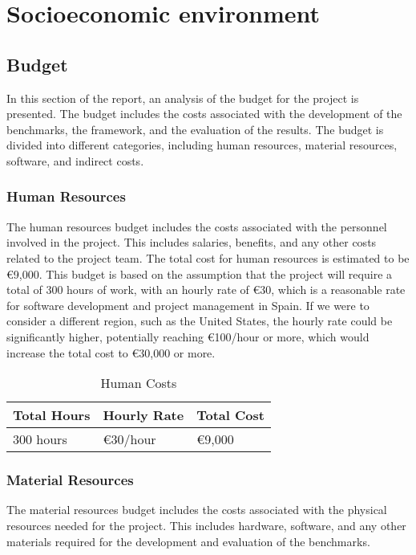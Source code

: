 \chapter{Socioeconomic environment}\label{chap:economic-env}

\section{Budget}
In this section of the report, an analysis of the budget for the project is presented. The budget includes the costs associated with the development of the benchmarks, the framework, and the evaluation of the results. The budget is divided into different categories, including human resources, material resources, software, and indirect costs.

\subsection{Human Resources}
The human resources budget includes the costs associated with the personnel involved in the project. This includes salaries, benefits, and any other costs related to the project team. The total cost for human resources is estimated to be €9,000. This budget is based on the assumption that the project will require a total of 300 hours of work, with an hourly rate of €30, which is a reasonable rate for software development and project management in Spain. If we were to consider a different region, such as the United States, the hourly rate could be significantly higher, potentially reaching €100/hour or more, which would increase the total cost to €30,000 or more.

\begin{table}[h]
  \centering
  \begin{tabular}{lll}
    \textbf{Total Hours} & \textbf{Hourly Rate} & \textbf{Total Cost} \\
    \hline
    300 hours & €30/hour & €9,000 \\
  \end{tabular}
  \caption{Human Costs}
  \label{tab:human-resources}
\end{table}

\subsection{Material Resources}
The material resources budget includes the costs associated with the physical resources needed for the project. This includes hardware, software, and any other materials required for the development and evaluation of the benchmarks.

